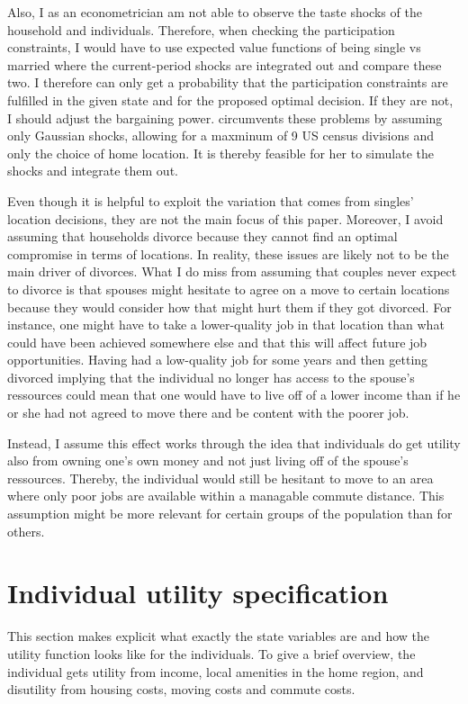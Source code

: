 Also, I as an econometrician am not able to observe the taste shocks of the household and individuals. Therefore, when checking the participation constraints, I would have to use expected value functions of being single vs married where the current-period shocks are integrated out and compare these two. I therefore can only get a probability that the participation constraints are fulfilled in the given state and for the proposed optimal decision. If they are not, I should adjust the bargaining power. \cite{Gemici2011} circumvents these problems by assuming only Gaussian shocks, allowing for a maxminum of 9 US census divisions and only the choice of home location. It is thereby feasible for her to simulate the shocks and integrate them out.

Even though it is helpful to exploit the variation that comes from singles' location decisions, they are not the main focus of this paper. Moreover, I avoid assuming that households divorce because they cannot find an optimal compromise in terms of locations. In reality, these issues are likely not to be the main driver of divorces. What I do miss from assuming that couples never expect to divorce is that spouses might hesitate to agree on a move to certain locations because they would consider how that might hurt them if they got divorced. For instance, one might have to take a lower-quality job in that location than what could have been achieved somewhere else and that this will affect future job opportunities. Having had a low-quality job for some years and then getting divorced implying that the individual no longer has access to the spouse's ressources could mean that one would have to live off of a lower income than if he or she had not agreed to move there and be content with the poorer job.

Instead, I assume this effect works through the idea that individuals do get utility also from owning one's own money and not just living off of the spouse's ressources. Thereby, the individual would still be hesitant to move to an area where only poor jobs are available within a managable commute distance. This assumption might be more relevant for certain groups of the population than for others.  

\section{Individual utility specification}
This section makes explicit what exactly the state variables are and how the utility function looks like for the individuals. To give a brief overview, the individual gets utility from income, local amenities in the home region, and disutility from housing costs, moving costs and commute costs. 

